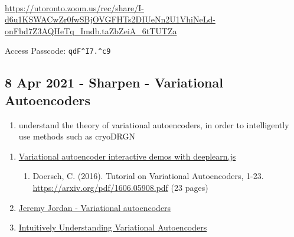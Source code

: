 \documentclass[11pt, oneside]{article}   	%
\begin{document}
 \\
{\tiny \url{https://utoronto.zoom.us/rec/share/I-d6u1KSWACwZr0fwSBjOVGFHTs2DIUeNn2U1VhiNeLd-onFbd7Z3AQHeTq\_Imdb.taZbZeiA\_6tTUTZa}}

Access Passcode: \texttt{qdF\^{}I7.\^{}c9}

\subsection{8 Apr 2021 - Sharpen - Variational Autoencoders }
\begin{enumerate}
  \item understand the theory of variational autoencoders, in order to intelligently use methods such as cryoDRGN
\end{enumerate}
\begin{enumerate}
	\item \href{https://www.siarez.com/projects/variational-autoencoder}{Variational autoencoder interactive demos with deeplearn.js}
	\begin{enumerate}
		\item Doersch, C. (2016). Tutorial on Variational Autoencoders, 1-23. \url{https://arxiv.org/pdf/1606.05908.pdf} (23 pages)
	\end{enumerate}
	\item \href{https://www.jeremyjordan.me/variational-autoencoders/}{Jeremy Jordan - Variational autoencoders}
	\item \href{https://towardsdatascience.com/intuitively-understanding-variational-autoencoders-1bfe67eb5daf}{Intuitively Understanding Variational Autoencoders}
\end{enumerate}
\end{document}
